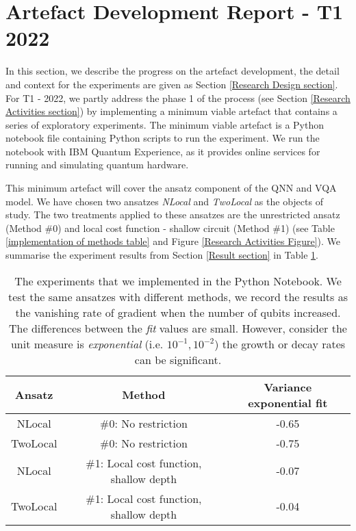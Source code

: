 \section{Artefact Development Report - T1 2022}
\label{Minimum Artefact section}

In this section, we describe the progress on the artefact development, the detail and context for the experiments are given as Section \ref{Research Design section}.
For T1 - 2022, we partly address the phase 1 of the process (see Section \ref{Research Activities section}) by implementing a minimum viable artefact that contains a series of exploratory experiments.
The minimum viable artefact is a Python notebook file containing Python scripts to run the experiment.
We run the notebook with IBM Quantum Experience, as it provides online services for running and simulating quantum hardware.

This minimum artefact will cover the ansatz component of the QNN and VQA model.
We have chosen two ansatzes \emph{NLocal} and \emph{TwoLocal} as the objects of study.
The two treatments applied to these ansatzes are the unrestricted ansatz (Method \#0) and local cost function - shallow circuit (Method \#1) (see Table \ref{implementation of methods table} and Figure \ref{Research Activities Figure}).
We summarise the experiment results from Section \ref{Result section} in Table \ref{Experiment summary table}.

\begin{table}
    \centering
    \begin{tabular}{|| c c c ||}
        \hline
        Ansatz   & Method                                  & Variance exponential fit \\[0.5ex]
        \hline \hline
        NLocal   & \#0: No restriction                     & -0.65                    \\
        \hline
        TwoLocal & \#0: No restriction                     & -0.75                    \\
        \hline
        NLocal   & \#1: Local cost function, shallow depth & -0.07                    \\
        \hline
        TwoLocal & \#1: Local cost function, shallow depth & -0.04                    \\
        \hline
    \end{tabular}
    \caption{
        The experiments that we implemented in the Python Notebook. We test the same ansatzes with different methods, we record the results as the vanishing rate of gradient when the number of qubits increased.
        The differences between the \emph{fit} values are small.
        However, consider the unit measure is \emph{exponential} (i.e. $10^{-1}, 10^{-2}$) the growth or decay rates can be significant.
    }
    \label{Experiment summary table}
\end{table}













